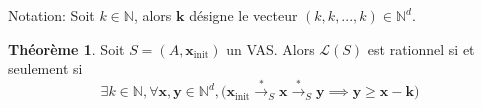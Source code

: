 \documentclass[a4paper,final]{article}
\theoremstyle{definition}
\newtheorem{Theorem}{Théorème}
\let\geq\geqslant
\newcommand{\N}{\ensuremath{\mathbb{N}}}
\newcommand{\lang}{\ensuremath{\mathcal{L}}}
\newcommand{\trans}[2]{\ensuremath{\stackrel{#1}{\longrightarrow}_{#2}}}
\newcommand{\vect}[1]{\ensuremath{\mathbf{#1}}}
\newcommand{\xinit}{\ensuremath{\vect{x}_\text{init}}}
\begin{document}

Notation:  Soit $k \in \N$, alors $\vect{k}$ désigne le vecteur $(k,k,...,k)\in\N^d$.

\begin{Theorem}
    Soit $S=(A,\xinit)$ un VAS.
    Alors $\lang(S)$ est rationnel si et seulement si
    \begin{equation}
        \exists k\in\N, \forall \vect{x},\vect{y}\in\N^d, 
\big( \xinit\trans{*}{S} \vect{x} \trans{*}{S} \vect{y}\implies
\vect{y}\geq \vect{x} -\vect{k} \big)
    \label{eq:caracterisation}
    \end{equation}
\end{Theorem}
\end{document}
